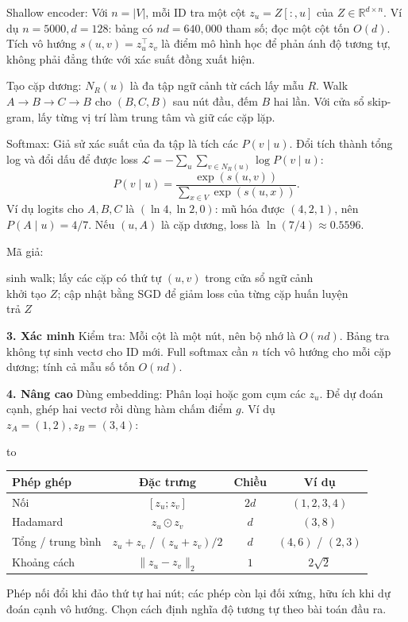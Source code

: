 \documentclass[10pt,a4paper,twocolumn]{article}
\makeatletter
\newcommand{\key}[1]{#1:\enspace}
\newenvironment{examtable}[1]{%
  \par\addvspace{2pt}\noindent\hbox to \linewidth\bgroup\hfil
  \setlength{\tabcolsep}{4pt}%
  \renewcommand{\arraystretch}{1.12}\begin{tabular}{#1}%
}{\end{tabular}\hfil\egroup\par\addvspace{2pt}}
\newcommand{\unitheading}[2]{%
  \par\addvspace{1pt}\noindent\textbf{#1. #2}\enspace}
\newcommand{\unitverification}{\unitheading{3}{Xác minh}}
\newcommand{\unitadvanced}{\unitheading{4}{Nâng cao}}
\newenvironment{algpseudo}{%
  \par\addvspace{2pt}\noindent
  \setlength{\parskip}{0pt}%
  Mã giả:\par\nobreak
  \begin{list}{}{\setlength{\leftmargin}{1em}\setlength{\topsep}{0pt}%
    \setlength{\partopsep}{0pt}\setlength{\parsep}{0pt}%
    \@beginparpenalty=10000\relax}%
  \item\relax
}{\end{list}\par\addvspace{3pt}}
\makeatother
\begin{document}
\key{Shallow encoder} Với $n=|V|$, mỗi ID tra một cột $z_u=Z[:,u]$ của $Z\in\mathbb R^{d\times n}$. Ví dụ $n=5000,d=128$: bảng có $nd=640{,}000$ tham số; đọc một cột tốn $O(d)$. Tích vô hướng $s(u,v)=z_u^\top z_v$ là điểm mô hình học để phản ánh độ tương tự, không phải đẳng thức với xác suất đồng xuất hiện.

\key{Tạo cặp dương} $N_R(u)$ là đa tập ngữ cảnh từ cách lấy mẫu $R$. Walk $A\to B\to C\to B$ cho $(B,C,B)$ sau nút đầu, đếm $B$ hai lần. Với cửa sổ skip-gram, lấy từng vị trí làm trung tâm và giữ các cặp lặp.

\key{Softmax} Giả sử xác suất của đa tập là tích các $P(v\mid u)$. Đổi tích thành tổng log và đổi dấu để được loss $\mathcal L=-\sum_u\sum_{v\in N_R(u)}\log P(v\mid u)$:
\[
P(v\mid u)=\frac{\exp(s(u,v))}{\sum_{x\in V}\exp(s(u,x))}.
\]
Ví dụ logits cho $A,B,C$ là $(\ln4,\ln2,0)$: mũ hóa được $(4,2,1)$, nên $P(A\mid u)=4/7$. Nếu $(u,A)$ là cặp dương, loss là $\ln(7/4)\approx0.5596$.

\begin{algpseudo}
sinh walk; lấy các cặp có thứ tự $(u,v)$ trong cửa sổ ngữ cảnh\\
khởi tạo $Z$; cập nhật bằng SGD để giảm loss của từng cặp huấn luyện\\
trả $Z$
\end{algpseudo}

\unitverification
\key{Kiểm tra} Mỗi cột là một nút, nên bộ nhớ là $O(nd)$. Bảng tra không tự sinh vectơ cho ID mới. Full softmax cần $n$ tích vô hướng cho mỗi cặp dương; tính cả mẫu số tốn $O(nd)$.

\unitadvanced
\key{Dùng embedding} Phân loại hoặc gom cụm các $z_u$. Để dự đoán cạnh, ghép hai vectơ rồi dùng hàm chấm điểm $g$. Ví dụ $z_A=(1,2),z_B=(3,4)$:
\begin{examtable}{@{}lccc@{}}
\toprule
Phép ghép & Đặc trưng & Chiều & Ví dụ \\
\midrule
Nối & $[z_u;z_v]$ & $2d$ & $(1,2,3,4)$ \\
Hadamard & $z_u\odot z_v$ & $d$ & $(3,8)$ \\
Tổng / trung bình & $z_u+z_v$ / $(z_u+z_v)/2$ & $d$ & $(4,6)$ / $(2,3)$ \\
Khoảng cách & $\|z_u-z_v\|_2$ & $1$ & $2\sqrt2$ \\
\bottomrule
\end{examtable}
Phép nối đổi khi đảo thứ tự hai nút; các phép còn lại đối xứng, hữu ích khi dự đoán cạnh vô hướng. Chọn cách định nghĩa độ tương tự theo bài toán đầu ra.
\end{document}

